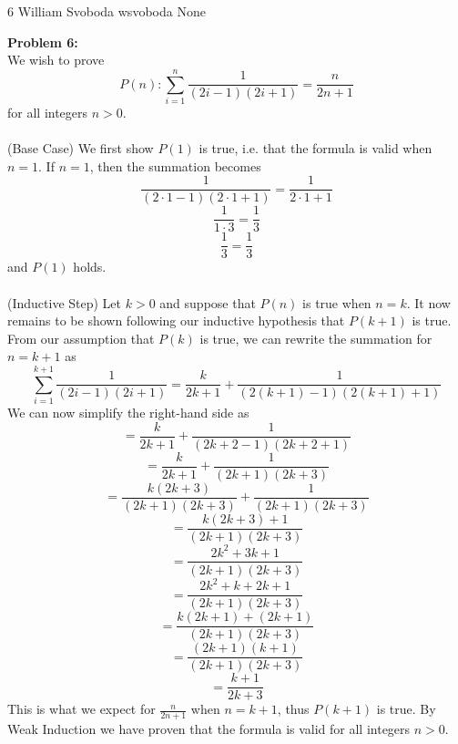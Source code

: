 \documentclass[12pt,letterpaper]{cos340hw}
\begin{document}
           {6}            %
           {William Svoboda}  %
           {wsvoboda}   %
           {None} 




\noindent\textbf{Problem 6:}\\
We wish to prove
$$P(n):\sum_{i=1}^n \frac{1}{(2i-1)(2i+1)}=\frac{n}{2n+1}$$
for all integers $n>0$.\\\\
(Base Case)
We first show $P(1)$ is true, i.e. that the formula is valid when
$n=1$. If $n=1$, then the summation becomes
$$\frac{1}{(2\cdot1-1)(2\cdot1+1)}=\frac{1}{2\cdot1+1}$$
$$\frac{1}{1\cdot3}=\frac{1}{3}$$
$$\frac{1}{3}=\frac{1}{3}$$
and $P(1)$ holds.\\\\
(Inductive Step) Let $k>0$ and suppose that $P(n)$ is true when $n=k$. It now remains to be shown 
following our inductive hypothesis that $P(k+1)$ is true. \\
From our assumption that $P(k)$ is true, we can rewrite the summation for $n=k+1$ as
$$\sum_{i=1}^{k+1} \frac{1}{(2i-1)(2i+1)}=\frac{k}{2k+1}+\frac{1}{(2(k+1)-1)(2(k+1)+1)}$$
We can now simplify the right-hand side as
$$=\frac{k}{2k+1}+\frac{1}{(2k+2-1)(2k+2+1)}$$
$$=\frac{k}{2k+1}+\frac{1}{(2k+1)(2k+3)}$$
$$=\frac{k(2k+3)}{(2k+1)(2k+3)}+\frac{1}{(2k+1)(2k+3)}$$
$$=\frac{k(2k+3)+1}{(2k+1)(2k+3)}$$
$$=\frac{2k^2+3k+1}{(2k+1)(2k+3)}$$
$$=\frac{2k^2+k+2k+1}{(2k+1)(2k+3)}$$
$$=\frac{k(2k+1)+(2k+1)}{(2k+1)(2k+3)}$$
$$=\frac{(2k+1)(k+1)}{(2k+1)(2k+3)}$$
$$=\frac{k+1}{2k+3}$$
This is what we expect for $\frac{n}{2n+1}$ when $n=k+1$, thus $P(k+1)$ is true. By Weak Induction 
we have proven that the formula is valid for all integers $n>0$.

\end{document}
